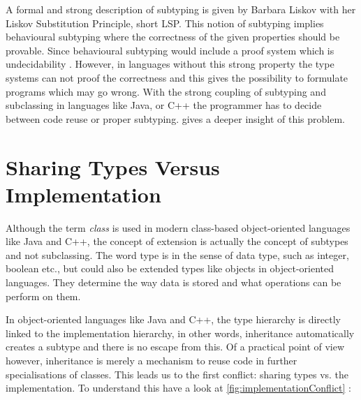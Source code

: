 A formal and strong description of subtyping is given by Barbara
Liskov with her Liskov Substitution Principle, short LSP. This notion
of subtyping implies behavioural subtyping where the correctness
of the given properties should be provable. Since behavioural
subtyping would include a proof system which is undecidability
\cite{poll_behavioural_1998}. However, in languages without this strong
property the type systems can not proof the correctness and this gives
the possibility to formulate programs which may go wrong. With the
strong coupling of subtyping and subclassing in languages like Java,
\cs or C++ the programmer has to decide between code reuse or proper
subtyping.  gives a deeper insight of this
problem.

\section{Sharing Types Versus Implementation}
\label{sec:sharingTypes}

Although the term \emph{class} is used in modern class-based object-oriented
languages like Java and C++, the concept of extension is actually the
concept of subtypes and not subclassing. The word type is in the sense of data type, such
as integer, boolean etc., but could also be extended types like objects
in object-oriented languages. They determine the way data is stored and
what operations can be perform on them.

In object-oriented languages like Java and C++, the type hierarchy
is directly linked to the implementation hierarchy, in other words,
inheritance automatically creates a subtype and there is no escape
from this. Of a practical point of view however, inheritance is merely
a mechanism to reuse code in further specialisations of classes. This
leads us to the first conflict: sharing types vs. the implementation. To
understand this have a look at \cref{fig:implementationConflict}
\cite{simons_theory_2003-4}:


